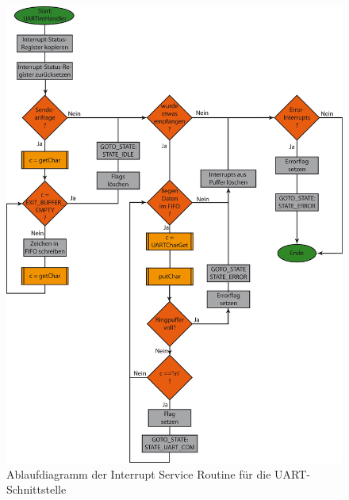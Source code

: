 \begin{figure}[h]
\includegraphics[scale = 0.8]{./ISR.png}
\hspace{-14pt}
\caption{Ablaufdiagramm der Interrupt Service Routine für die UART-Schnittstelle}
\end{figure} 

